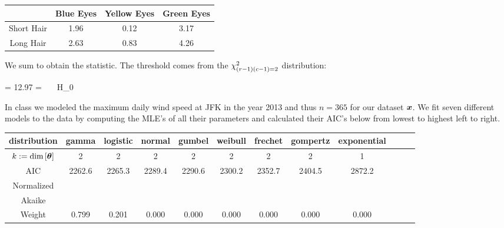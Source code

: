 \documentclass[12pt]{article}
\begin{document}
\begin{enumerate}[(a)]
{%
\begin{tabular}{c|ccc}
                & Blue Eyes & Yellow Eyes & Green Eyes   \\ \hline
Short Hair  & 1.96 &0.12 &3.17              \\
Long Hair   & 2.63 & 0.83 & 4.26  \\ 
\end{tabular}

We sum to obtain the statistic. The threshold comes from the $\chi^2_{(r-1)(c-1) = 2}$ distribution:

\beqn
\doublehat{\phi} = 12.97 \notin {} = ~\Rightarrow~~H_0
\eeqn
}

\end{enumerate}
\pagebreak

\problem In class we modeled the maximum daily wind speed at JFK in the year 2013 and thus $n = 365$ for our dataset $\boldsymbol{x}$. We fit seven different models to the data by computing the MLE's of all their parameters and calculated their AIC's below from lowest to highest left to right.

\begin{table}[htp]
\centering
\begin{tabular}{c|ccccccccccc}
distribution    &gamma    & logistic     & normal   & gumbel  & weibull  &  frechet & gompertz      & exponential \\ \hline \hline
$k := \text{dim}\left[\boldsymbol{\theta}\right]$ & 2 & 2 & 2 & 2 & 2 & 2 & 2 & 1 \\
AIC  & 2262.6   & 2265.3     & 2289.4   & 2290.6   & 2300.2   & 2352.7  & 2404.5   & 2872.2 \\ \hline
Normalized  \\
Akaike \\
Weight &    0.799  &  0.201  &  0.000  &  0.000 &   0.000  &  0.000  &  0.000  &  0.000 
\end{tabular}
\end{table}
\end{document}
